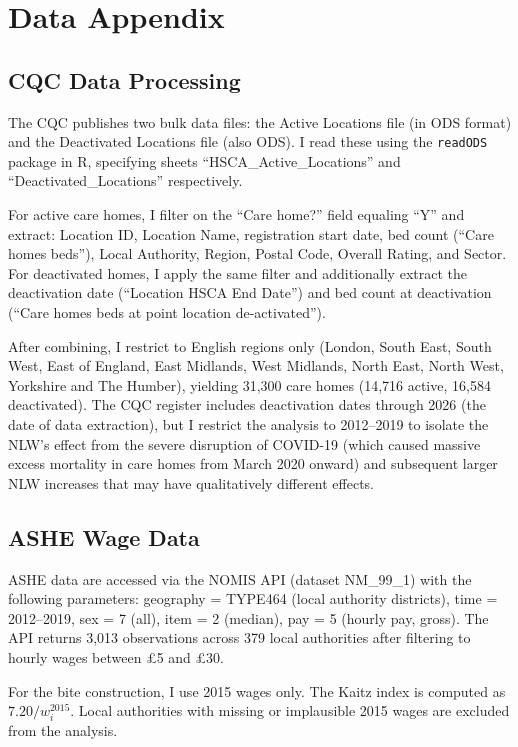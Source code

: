 \documentclass[12pt]{article}
\begin{document}
\section{Data Appendix}
\label{app:data}

\subsection{CQC Data Processing}

The CQC publishes two bulk data files: the Active Locations file (in ODS format) and the Deactivated Locations file (also ODS). I read these using the \texttt{readODS} package in R, specifying sheets ``HSCA\_Active\_Locations'' and ``Deactivated\_Locations'' respectively.

For active care homes, I filter on the ``Care home?'' field equaling ``Y'' and extract: Location ID, Location Name, registration start date, bed count (``Care homes beds''), Local Authority, Region, Postal Code, Overall Rating, and Sector. For deactivated homes, I apply the same filter and additionally extract the deactivation date (``Location HSCA End Date'') and bed count at deactivation (``Care homes beds at point location de-activated'').

After combining, I restrict to English regions only (London, South East, South West, East of England, East Midlands, West Midlands, North East, North West, Yorkshire and The Humber), yielding 31,300 care homes (14,716 active, 16,584 deactivated). The CQC register includes deactivation dates through 2026 (the date of data extraction), but I restrict the analysis to 2012--2019 to isolate the NLW's effect from the severe disruption of COVID-19 (which caused massive excess mortality in care homes from March 2020 onward) and subsequent larger NLW increases that may have qualitatively different effects.

\subsection{ASHE Wage Data}

ASHE data are accessed via the NOMIS API (dataset NM\_99\_1) with the following parameters: geography = TYPE464 (local authority districts), time = 2012--2019, sex = 7 (all), item = 2 (median), pay = 5 (hourly pay, gross). The API returns 3,013 observations across 379 local authorities after filtering to hourly wages between \pounds5 and \pounds30.

For the bite construction, I use 2015 wages only. The Kaitz index is computed as $7.20 / w_i^{2015}$. Local authorities with missing or implausible 2015 wages are excluded from the analysis.
\end{document}
